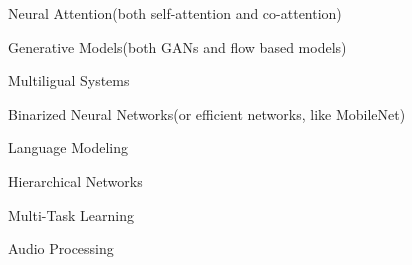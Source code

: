 

\begin{cventries}

\vspace{5mm}

  \begin{cvitems} %
  	\item {Neural Attention(both self-attention and co-attention)}
    \item {Generative Models(both GANs and flow based models)}
  	\item {Multiligual Systems}
    \item {Binarized Neural Networks(or efficient networks, like MobileNet)}
    \item {Language Modeling}
  	\item {Hierarchical Networks}
  	\item {Multi-Task Learning}
    \item {Audio Processing}
   \end{cvitems}
    
\end{cventries}
